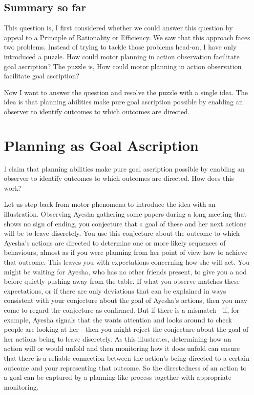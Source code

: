 \documentclass[12pt,\papersize]{extarticle}
\begin{document}
\subsection{Summary so far}
This question is, \theQuestion 
I first considered whether we could answer this question by appeal to a Principle of Rationality or Efficiency.
We saw that this approach faces two problems.
Instead of trying to tackle those problems head-on, 
 I have only introduced a puzzle.
How could motor planning in action observation facilitate goal ascription?  
\newcommand{\thePuzzle}{How could motor planning in action observation facilitate goal ascription?  }
The  puzzle is, \thePuzzle 

Now I want to answer the question and resolve the puzzle with a single idea.
The idea is that%
\newcommand{\theThesis}{planning abilities make pure goal ascription possible by enabling an observer to identify outcomes to which outcomes are directed. }
 \theThesis

\section{Planning as Goal Ascription}
I claim that \theThesis
How does this work?

Let us step back from motor phenomena to introduce the idea with an illustration.  
Observing Ayesha gathering some papers during a long meeting that shows no sign of ending, you conjecture that a goal of these and her next actions will be to leave discretely. You use this conjecture about the outcome to which Ayesha's actions are directed to determine one or more likely sequences of behaviours, almost as if you were planning from her point of view how to achieve that outcome. This leaves you with expectations concerning how she will act. You might be waiting for Ayesha, who has no other friends present, to give you a nod before quietly pushing away from the table. If what you observe matches these expectations, or if there are only deviations that can be explained in ways consistent with your conjecture about the goal of Ayesha's actions, then you may come to regard the conjecture as confirmed. But if there is a mismatch---if, for example, Ayesha signals that she wants attention and looks around to check people are looking at her---then you might reject the conjecture about the goal of her actions being to leave discretely. As this illustrates, determining how an action will or would unfold and then monitoring how it does unfold can ensure that there is a reliable connection between the action's being directed to a certain outcome and your representing that outcome. So the directedness of an action to a goal can be captured by a planning-like process together with appropriate monitoring.
\end{document}

